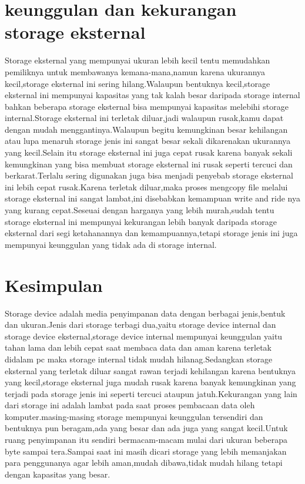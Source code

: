 \section{keunggulan dan kekurangan storage eksternal}

Storage eksternal yang mempunyai ukuran lebih kecil tentu memudahkan pemiliknya untuk membawanya kemana-mana,namun karena ukurannya kecil,storage eksternal ini sering hilang.Walaupun bentuknya kecil,storage eksternal ini mempunyai kapasitas yang tak kalah besar daripada storage internal bahkan beberapa storage eksternal bisa mempunyai kapasitas melebihi storage internal.Storage eksternal ini terletak diluar,jadi walaupun rusak,kamu dapat dengan mudah menggantinya.Walaupun begitu kemungkinan besar kehilangan atau lupa menaruh storage jenis ini sangat besar sekali dikarenakan ukurannya yang kecil.Selain itu storage eksternal ini juga cepat rusak karena banyak sekali kemungkinan yang bisa membuat storage eksternal ini rusak seperti tercuci dan berkarat.Terlalu sering digunakan juga bisa menjadi penyebab storage eksternal ini lebih cepat rusak.Karena terletak diluar,maka proses mengcopy file melalui storage eksternal ini sangat lambat,ini disebabkan kemampuan write and ride nya yang kurang cepat.Seseuai dengan harganya yang lebih murah,sudah tentu storage eksternal ini mempunyai kekurangan lebih banyak daripada storage eksternal dari segi ketahanannya dan kemampuannya,tetapi storage jenis ini juga mempunyai keunggulan yang tidak ada di storage internal.

\section{Kesimpulan}

Storage device adalah media penyimpanan data dengan berbagai jenis,bentuk dan ukuran.Jenis dari storage terbagi dua,yaitu storage device internal dan storage device eksternal,storage device internal mempunyai keunggulan yaitu tahan lama dan lebih cepat saat membaca data dan aman karena terletak didalam pc maka storage internal tidak mudah hilanag.Sedangkan storage eksternal yang terletak diluar sangat rawan terjadi kehilangan karena bentuknya yang kecil,storage eksternal juga mudah rusak karena banyak kemungkinan yang terjadi pada storage jenis ini seperti tercuci ataupun jatuh.Kekurangan yang lain dari storage ini adalah lambat pada saat proses pembacaan data oleh komputer.masing-masing storage mempunyai keunggulan tersendiri dan bentuknya pun beragam,ada yang besar dan ada juga yang sangat kecil.Untuk ruang penyimpanan itu sendiri bermacam-macam mulai dari ukuran beberapa byte sampai tera.Sampai saat ini masih dicari storage yang lebih memanjakan para penggunanya agar lebih aman,mudah dibawa,tidak mudah hilang tetapi dengan kapasitas yang besar.



